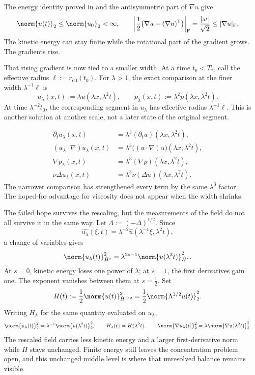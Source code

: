The energy identity proved in  and the antisymmetric part of \(\nabla u\) give
\[
  \norm{u(t)}_2
  \leq
  \norm{u_0}_2
  <\infty,
  \qquad
  \left|\frac12\bigl(\nabla u-(\nabla u)^{\mathsf T}\bigr)\right|_{\mathrm F}
  =
  \frac{|\omega|}{\sqrt2}
  \leq
  |\nabla u|_{\mathrm F}.
\]
The kinetic energy can stay finite while the rotational part of the gradient grows. The gradients rise.


That rising gradient is now tied to a smaller width. At a time \(t_0<T_*\), call the effective radius \(\ell:=r_{\mathrm{eff}}(t_0)\). For \(\lambda>1\), the exact \NavierStokes{} comparison at the finer width \(\lambda^{-1}\ell\) is
\[
  u_\lambda(x,t)
  :=
  \lambda u(\lambda x,\lambda^2t),
  \qquad
  p_\lambda(x,t)
  :=
  \lambda^2p(\lambda x,\lambda^2t).
\]
At time \(\lambda^{-2}t_0\), the corresponding segment in \(u_\lambda\) has effective radius \(\lambda^{-1}\ell\). This is another solution at another scale, not a later state of the original segment.

\[
\begin{aligned}
  \partial_tu_\lambda(x,t)
  &=
  \lambda^3(\partial_tu)(\lambda x,\lambda^2t),
  \\
  (u_\lambda\cdot\nabla)u_\lambda(x,t)
  &=
  \lambda^3\bigl((u\cdot\nabla)u\bigr)(\lambda x,\lambda^2t),
  \\
  \nabla p_\lambda(x,t)
  &=
  \lambda^3(\nabla p)(\lambda x,\lambda^2t),
  \\
  \nu\Delta u_\lambda(x,t)
  &=
  \lambda^3\nu(\Delta u)(\lambda x,\lambda^2t).
\end{aligned}
\]
The narrower comparison has strengthened every term by the same \(\lambda^3\) factor. The hoped-for advantage for viscosity does not appear when the width shrinks.


The failed hope survives the rescaling, but the measurements of the field do not all survive it in the same way. Let \(\Lambda:=(-\Delta)^{1/2}\). Since
\[
  \widehat{u_\lambda}(\xi,t)
  =
  \lambda^{-2}\widehat u(\lambda^{-1}\xi,\lambda^2t),
\]
a change of variables gives
\[
  \norm{u_\lambda(t)}_{\dot H^s}^2
  =
  \lambda^{2s-1}
  \norm{u(\lambda^2t)}_{\dot H^s}^2.
\]
At \(s=0\), kinetic energy loses one power of \(\lambda\); at \(s=1\), the first derivatives gain one. The exponent vanishes between them at \(s=\tfrac12\). Set
\[
  H(t)
  :=
  \frac12\norm{u(t)}_{\dot H^{1/2}}^2
  =
  \frac12\norm{\Lambda^{1/2}u(t)}_2^2.
\]
Writing \(H_\lambda\) for the same quantity evaluated on \(u_\lambda\),
\[
  \norm{u_\lambda(t)}_2^2
  =
  \lambda^{-1}\norm{u(\lambda^2t)}_2^2,
  \qquad
  H_\lambda(t)=H(\lambda^2t),
  \qquad
  \norm{\nabla u_\lambda(t)}_2^2
  =
  \lambda\norm{\nabla u(\lambda^2t)}_2^2.
\]
The rescaled field carries less kinetic energy and a larger first-derivative norm while \(H\) stays unchanged. Finite energy still leaves the concentration problem open, and this unchanged middle level is where that unresolved balance remains visible.

